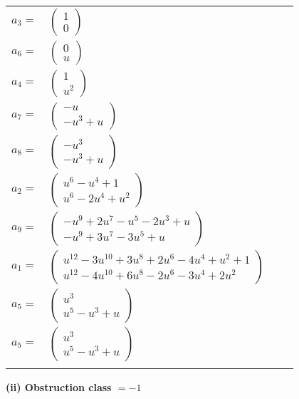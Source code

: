 \documentclass[1p]{elsarticle_modified}
\theoremstyle{definition}
\begin{document}
\begin{tabular}{m{7pt} m{180pt} m{7pt} m{180pt} }
\flushright $a_{3}=$&$\begin{pmatrix}1\\0\end{pmatrix}$ \\
\flushright $a_{6}=$&$\begin{pmatrix}0\\u\end{pmatrix}$ \\
\flushright $a_{4}=$&$\begin{pmatrix}1\\u^2\end{pmatrix}$ \\
\flushright $a_{7}=$&$\begin{pmatrix}- u\\- u^3+u\end{pmatrix}$ \\
\flushright $a_{8}=$&$\begin{pmatrix}- u^3\\- u^3+u\end{pmatrix}$ \\
\flushright $a_{2}=$&$\begin{pmatrix}u^6- u^4+1\\u^6-2 u^4+u^2\end{pmatrix}$ \\
\flushright $a_{9}=$&$\begin{pmatrix}- u^9+2 u^7- u^5-2 u^3+u\\- u^9+3 u^7-3 u^5+u\end{pmatrix}$ \\
\flushright $a_{1}=$&$\begin{pmatrix}u^{12}-3 u^{10}+3 u^8+2 u^6-4 u^4+u^2+1\\u^{12}-4 u^{10}+6 u^8-2 u^6-3 u^4+2 u^2\end{pmatrix}$ \\
\flushright $a_{5}=$&$\begin{pmatrix}u^3\\u^5- u^3+u\end{pmatrix}$\\ \flushright $a_{5}=$&$\begin{pmatrix}u^3\\u^5- u^3+u\end{pmatrix}$\\&\end{tabular}
\flushleft \textbf{(ii) Obstruction class $= -1$}\\~\\
\end{document}
